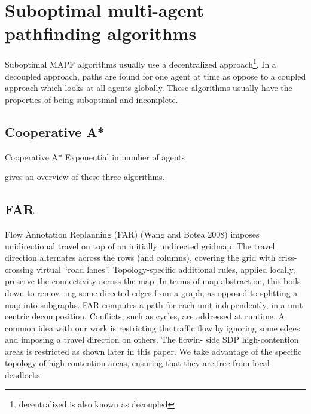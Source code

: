 \documentclass[a4paper,11pt]{article}
\begin{document}


\section{Suboptimal multi-agent pathfinding algorithms}
Suboptimal MAPF algorithms usually use a decentralized approach\footnote{decentralized is also known as decoupled}. In a decoupled approach, paths are found for one agent at time as oppose to a coupled approach which looks at all agents globally. These algorithms usually have the properties of being suboptimal and incomplete.


\subsection{Cooperative A*}
Cooperative A*
Exponential in number of agents

\cite{holte1995hierarchical}

\cite{silver2005cooperative} gives an overview of these three algorithms.

\subsection{FAR}
Flow Annotation Replanning (FAR) (Wang and Botea 2008) imposes unidirectional travel on top of an initially undirected gridmap. The travel direction alternates across the rows (and columns), covering the grid with criss- crossing virtual “road lanes”. Topology-specific additional rules, applied locally, preserve the connectivity across the map. In terms of map abstraction, this boils down to remov- ing some directed edges from a graph, as opposed to splitting a map into subgraphs. FAR computes a path for each unit independently, in a unit-centric decomposition. Conflicts, such as cycles, are addressed at runtime. A common idea with our work is restricting the traffic flow by ignoring some edges and imposing a travel direction on others. The flowin- side SDP high-contention areas is restricted as shown later in this paper. We take advantage of the specific topology of high-contention areas, ensuring that they are free from local deadlocks
\end{document}
